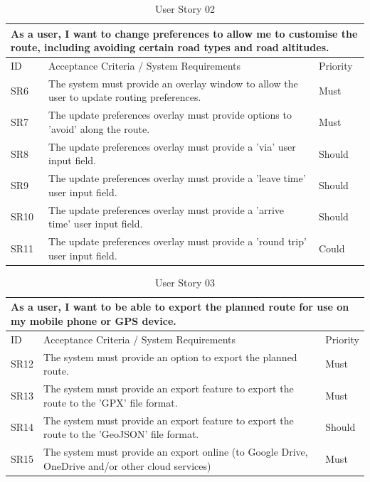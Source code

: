 \begin{table}[!htb]
  \caption{User Story 02}
  \label{tab:user-story-02}
  \begin{tabular}{ m{1cm} m{11cm} m{1cm} }
  \hline
  \multicolumn{3}{p{13cm}}{As a user, I want to change preferences to allow me to customise the route, including avoiding certain road types and road altitudes.}\\ 
  \hline
  ID & Acceptance Criteria / System Requirements & Priority\\
  \hline
  \label{SR:6}SR6 & The system must provide an overlay window to allow the user to update routing preferences. & Must \\
  \label{SR:7}SR7 & The update preferences overlay must provide options to 'avoid' along the route. & Must\\
  \label{SR:8}SR8 & The update preferences overlay must provide a 'via' user input field. & Should\\ 
  \label{SR:9}SR9 & The update preferences overlay must provide a 'leave time' user input field. & Should\\ 
  \label{SR:10}SR10 & The update preferences overlay must provide a 'arrive time' user input field. & Should\\ 
  \label{SR:11}SR11 & The update preferences overlay must provide a 'round trip' user input field. & Could\\ 
  \hline
  \end{tabular}
\end{table}

\begin{table}[!htb]
  \caption{User Story 03}
  \label{tab:user-story-03}
  \begin{tabular}{ m{1cm} m{11cm} m{1cm} }
  \hline
  \multicolumn{3}{p{13cm}}{As a user, I want to be able to export the planned route for use on my mobile phone or GPS device.}\\ 
  \hline
  ID & Acceptance Criteria / System Requirements & Priority\\
  \hline
  \label{SR:12}SR12 & The system must provide an option to export the planned route. & Must \\
  \label{SR:13}SR13 & The system must provide an export feature to export the route to the 'GPX' file format. & Must\\
  \label{SR:14}SR14 & The system must provide an export feature to export the route to the 'GeoJSON' file format. & Should\\ 
  \label{SR:15}SR15 & The system must provide an export online (to Google Drive, OneDrive and/or other cloud services) & Must\\
  \hline
  \end{tabular}
\end{table}

